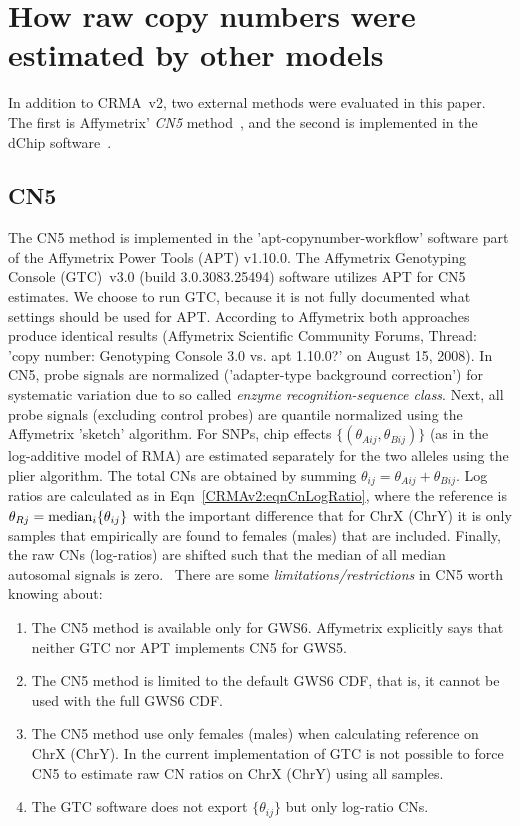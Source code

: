 \documentclass[10pt,a4paper]{article}
\newcommand{\GWSSix}{GWS6\xspace}
\DeclareMathOperator{\median}{\textnormal{median}}
\begin{document}
\clearpage
\section{How raw copy numbers were estimated by other models}
\label{secOtherMethods}
In addition to CRMA~v2, two external methods were evaluated in this paper.  The first is Affymetrix' \emph{CN5} method~\citep{Affymetrix_2008m}, and the second is implemented in the dChip software~\citep{LiWong_2001}.

\subsection{CN5}
The CN5 method is implemented in the 'apt-copynumber-workflow' software part of the Affymetrix Power Tools (APT) v1.10.0.  The Affymetrix Genotyping Console (GTC)~v3.0 (build 3.0.3083.25494) software \citep{Affymetrix_2008m} utilizes APT for CN5 estimates.  We choose to run GTC, because it is not fully documented what settings should be used for APT.  According to Affymetrix both approaches produce identical results (Affymetrix Scientific Community Forums, Thread: 'copy number: Genotyping Console 3.0 vs. apt 1.10.0?' on August 15, 2008).
In CN5, probe signals are normalized ('adapter-type background correction') for systematic variation due to so called \emph{enzyme recognition-sequence class}.   Next, all probe signals (excluding control probes) are quantile normalized using the Affymetrix 'sketch' algorithm.  For SNPs, chip effects $\{(\theta_{Aij}, \theta_{Bij})\}$ (as in the log-additive model of RMA) are estimated separately  for the two alleles using the plier algorithm.  The total CNs are obtained by summing $\theta_{ij}=\theta_{Aij}+\theta_{Bij}$.
Log ratios are calculated as in Eqn~\eqref{CRMAv2:eqnCnLogRatio}, where the reference is $\theta_{Rj}=\median_i\{\theta_{ij}\}$ with the important difference that for ChrX (ChrY) it is only samples that empirically are found to females (males) that are included.  Finally, the raw CNs (log-ratios) are shifted such that the median of all median autosomal signals is zero.~\citep{Affymetrix_2008m}
There are some \emph{limitations/restrictions} in CN5 worth knowing about:
\begin{enumerate}
\item The CN5 method is available only for \GWSSix.  Affymetrix explicitly says that neither GTC nor APT implements CN5 for GWS5.
\item The CN5 method is limited to the default GWS6 CDF, that is, it cannot be used with the full GWS6 CDF.
\item The CN5 method use only females (males) when calculating reference on ChrX (ChrY).  In the current implementation of GTC is not possible to force CN5 to estimate raw CN ratios on ChrX (ChrY) using all samples.
\item The GTC software does not export $\{\theta_{ij}\}$ but only log-ratio CNs.
\end{enumerate}
\end{document}
